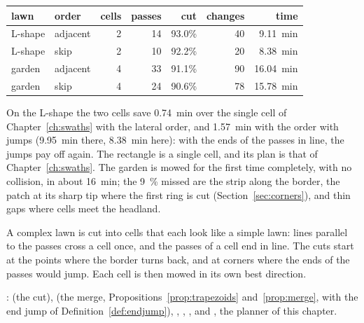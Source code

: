 \begin{center}
\begin{tabular}{@{}llrrrrr@{}}
  \toprule
  lawn & order & cells & passes & cut & changes & time \\
  \midrule
  L-shape & adjacent & 2 & 14 & 93.0\% & 40 & \SI{9.11}{\minute} \\
  L-shape & skip & 2 & 10 & 92.2\% & 20 & \SI{8.38}{\minute} \\
  garden & adjacent & 4 & 33 & 91.1\% & 90 & \SI{16.04}{\minute} \\
  garden & skip & 4 & 24 & 90.6\% & 78 & \SI{15.78}{\minute} \\
  \bottomrule
\end{tabular}
\end{center}

On the L-shape the two cells save \SI{0.74}{\minute} over the single cell
of Chapter~\ref{ch:swaths} with the lateral order, and \SI{1.57}{\minute}
with the order with jumps (\SI{9.95}{\minute} there, \SI{8.38}{\minute}
here): with the ends of the passes in line, the jumps pay off again. The
rectangle is a single cell, and its plan is that of
Chapter~\ref{ch:swaths}. The garden is mowed for the first time
completely, with no collision, in about \SI{16}{\minute}; the
\SI{9}{\percent} missed are the strip along the border, the patch at its
sharp tip where the first ring is cut (Section~\ref{sec:corners}), and
thin gaps where cells meet the headland.

\begin{inwords}
  A complex lawn is cut into cells that each look like a simple lawn: lines
  parallel to the passes cross a cell once, and the passes of a cell end in
  line. The cuts start at the points where the border turns back, and at
  corners where the ends of the passes would jump. Each cell is then mowed
  in its own best direction.
\end{inwords}

\begin{incode}
  :  (the cut),
   (the merge, Propositions~\ref{prop:trapezoids}
  and~\ref{prop:merge}, with the end jump of Definition~\ref{def:endjump}),
  , , ,
   and , the planner of this
  chapter.
\end{incode}
